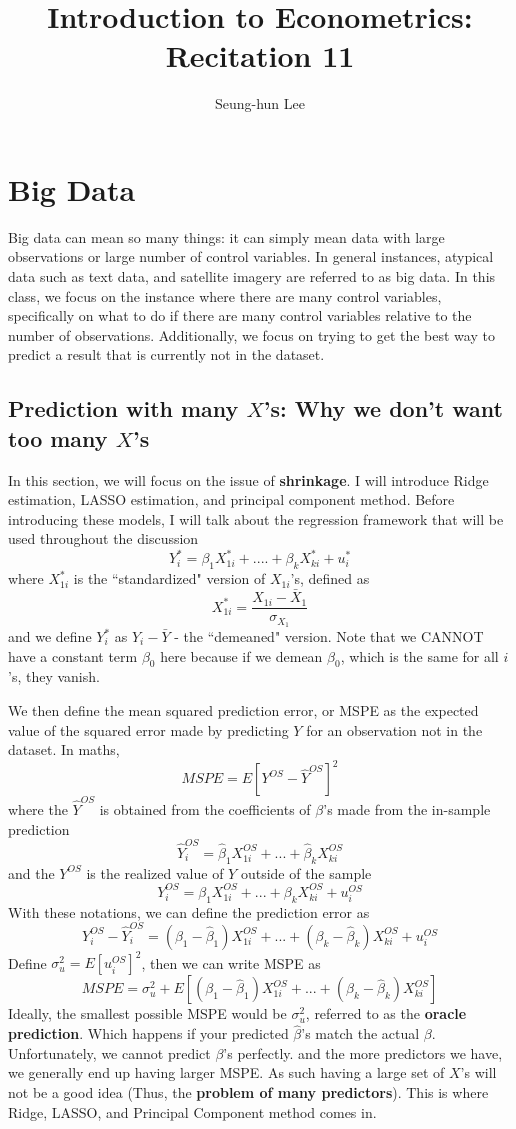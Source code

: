 \documentclass[12pt]{article}
\title{\Large{Introduction to Econometrics: Recitation 11}}
\theoremstyle{definition}
\theoremstyle{property}
\theoremstyle{assumption}
\theoremstyle{example}
\theoremstyle{comment}
\begin{document}
\linespread{1.25}
\author{Seung-hun Lee}
\date{}
\maketitle

\section{Big Data}
Big data can mean so many things: it can simply mean data with large observations or large number of control variables. In general instances, atypical data such as text data, and satellite imagery are referred to as big data. In this class, we focus on the instance where there are many control variables, specifically on what to do if there are many control variables relative to the number of observations. Additionally, we focus on trying to get the best way to predict a result that is currently not in the dataset.
\par\medskip 
\subsection{Prediction with many $X$'s: Why we don't want too many $X$'s}
In this section, we will focus on the issue of \textbf{shrinkage}. I will introduce Ridge estimation, LASSO estimation, and principal component method. Before introducing these models, I will talk about the regression framework that will be used throughout the discussion
\[
Y_{i}^*=\beta_1X_{1i}^*+....+\beta_kX_{ki}^*+u_i^*
\]
where $X_{1i}^*$ is the ``standardized" version of $X_{1i}$'s, defined as
\[
X_{1i}^*=\frac{X_{1i}-\bar{X}_1}{\sigma_{X_{1}}}
\]
and we define $Y^*_i$ as $Y_{i}-\bar{Y}$ - the ``demeaned" version. Note that we CANNOT have a constant term $\beta_0$ here because if we demean $\beta_0$, which is the same for all $i$'s, they vanish. 
\par\medskip
We then define the mean squared prediction error, or MSPE as the expected value of the squared error made by predicting $Y$ for an observation not in the dataset. In maths, 
\[
MSPE= E[Y^{OS}-\hat{Y}^{OS}]^2
\]
where the $\hat{Y}^{OS}$ is obtained from the coefficients of $\beta$'s made from the in-sample prediction
\[
\hat{Y}_i^{OS}=\hat{\beta}_1X_{1i}^{OS}+ ... +\hat{\beta}_kX_{ki}^{OS}
\]
and the $Y^{OS}$ is the realized value of $Y$ outside of the sample
\[
Y_i^{OS}=\beta_1X_{1i}^{OS}+ ... +\beta_kX_{ki}^{OS}+u_i^{OS}
\]
With these notations, we can define the prediction error as
\[
Y_i^{OS}-\hat{Y}_i^{OS}=(\beta_1-\hat{\beta}_1)X^{OS}_{1i}+...+(\beta_k-\hat{\beta}_k)X^{OS}_{ki}+u_i^{OS}
\]
Define $\sigma_u^2=E[u_i^{OS}]^2$, then we can write MSPE as
\[
MSPE=\sigma_u^2+ E[(\beta_1-\hat{\beta}_1)X^{OS}_{1i}+...+(\beta_k-\hat{\beta}_k)X^{OS}_{ki}]
\]
Ideally, the smallest possible MSPE would be $\sigma_u^2$, referred to as the \textbf{oracle prediction}. Which happens if your predicted $\hat{\beta}$'s match the actual $\beta$. Unfortunately, we cannot predict $\beta$'s perfectly. and the more predictors we have, we generally end up having larger MSPE. As such having a large set of $X$'s will not be a good idea (Thus, the \textbf{problem of many predictors}). This is where Ridge, LASSO, and Principal Component method comes in.
\end{document}
